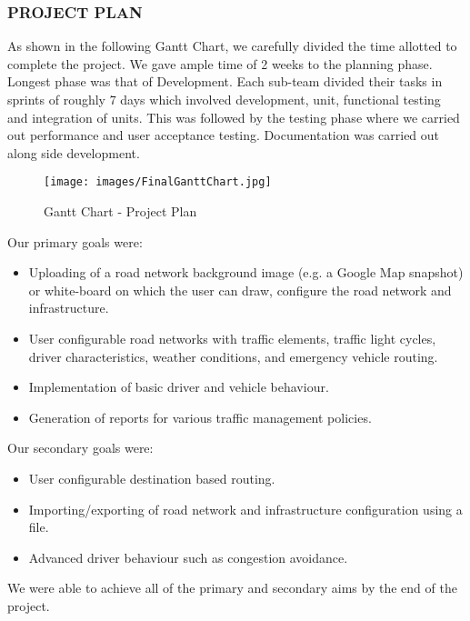 \documentclass[11pt,a4paper]{article}
\begin{document}
	\subsubsection{PROJECT PLAN}
	As shown in the following Gantt Chart, we carefully divided the time allotted to complete the project. We gave ample time of 2 weeks to the planning phase. Longest phase was that of Development. Each sub-team divided their tasks in sprints of roughly 7 days which involved development, unit, functional testing and integration of units. This was followed by the testing phase where we carried out performance and user acceptance testing. Documentation was carried out along side development.
	
		\graphicspath{{Images/}}
		\begin{figure}[h]
			\texttt{[image: images/FinalGanttChart.jpg]}
			\caption{Gantt Chart - Project Plan}
			\centering
		\end{figure}
	
	Our primary goals were:

	\begin{itemize}
	\setlength\itemsep{0.2em}
		\item Uploading of a road network background image (e.g. a Google Map snapshot) or white-board on which the user can draw, configure the road network and infrastructure.
		\item User configurable road networks with traffic elements, traffic light cycles, driver characteristics, weather conditions, and emergency vehicle routing.
		\item Implementation of basic driver and vehicle behaviour.
		\item Generation of reports for various traffic management policies.
	\end{itemize}

	Our secondary goals were:

	\begin{itemize}
	\setlength\itemsep{0.2em}
	\item User configurable destination based routing.
		\item Importing/exporting of road network and infrastructure configuration using a file.
		\item Advanced driver behaviour such as congestion avoidance.
	\end{itemize}

	We were able to achieve all of the primary and secondary aims by the end of the project.
\end{document}
